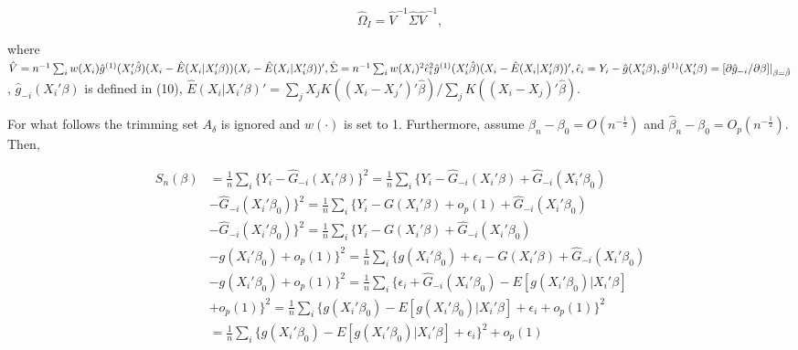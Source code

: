 \documentclass[a4paper]{article}
\newcommand{\norm}[1]{\left\lVert#1\right\rVert}
\begin{document}
\[ \hat{\Omega}_I = \hat{V}^{-1}\hat{\Sigma}\hat{V}^{-1}, \]

where $\hat{V} = n^{-1}\sum_{i} w(X_i)\hat{g}^{(1)}(X_i'\hat{\beta})(X_i - \hat{E}(X_i|X_i'\beta))(X_i - \hat{E}(X_i|X_i'\beta))', \hat{\Sigma} = n^{-1}\sum_{i} w(X_i)^2\hat{\epsilon}_{i}^{2}\hat{g}^{(1)}(X_i'\hat{\beta})(X_i - \hat{E}(X_i|X_i'\beta))', \hat{\epsilon}_i = Y_i - \hat{g}(X_i'\beta), \hat{g}^{(1)}(X_i'\beta) \linebreak
= [\partial \hat{g}_{-i}/\partial \beta]|_{\beta=\hat{\beta}}$, $\hat{g}_{-i}(X_i'\beta)$ is defined in (10), $\hat{E}(X_i|X_i'\beta)' = \sum_{j} X_jK((X_i - X_j')'\hat{\beta})/ \sum_{j}K((X_i - X_j)'\hat{\beta}).$

For what follows the trimming set $A_\delta$ is ignored and $w(\cdot)$ is set to 1. Furthermore, assume $\beta_n - \beta_0 = O(n^{-\frac{1}{2}})$ and $\hat{\beta}_n - \beta_0 = O_p(n^{-\frac{1}{2}})$. Then, 



\begin{align*}
S_{n}(\beta) & = \frac{1}{n}\sum_i \{ Y_i - \hat{G}_{-i}(X_i'\beta)\}^2 = \frac{1}{n}\sum_i\{Y_i - \hat{G}_{-i}(X_i'\beta) +  \hat{G}_{-i}(X_i'\beta_0) \\
			 & - \hat{G}_{-i}(X_i'\beta_0) \}^2 = \frac{1}{n} \sum_i \{Y_i - G(X_i'\beta) + o_p(1) + \hat{G}_{-i}(X_i'\beta_0) \\
			 & - \hat{G}_{-i}(X_i'\beta_0) \}^2 = \frac{1}{n}\sum_i \{ Y_i - G(X_i'\beta) + \hat{G}_{-i}(X_i'\beta_0) \\
			 & - g(X_i'\beta_0) + o_p(1) \}^2 = \frac{1}{n} \sum_i \{ g(X_i'\beta_0) + \epsilon_i - G(X_i'\beta) + \hat{G}_{-i}(X_i'\beta_0) \\
			 & - g(X_i'\beta_0) + o_p(1) \}^2 = \frac{1}{n} \sum_i \{ \epsilon_i + \hat{G}_{-i}(X_i'\beta_0) - E[g(X_i'\beta_0)|X_i'\beta] \\
			 & + o_p(1) \}^2 = \frac{1}{n}\sum_i \{ g(X_i'\beta_0) - E[g(X_i'\beta_0)|X_i'\beta] +  \epsilon_i + o_p(1)\}^2 \\
			 & = \frac{1}{n}\sum_i \{ g(X_i'\beta_0) - E[g(X_i'\beta_0)|X_i'\beta] +  \epsilon_i\}^2 + o_p(1)
\end{align*}
\end{document}
